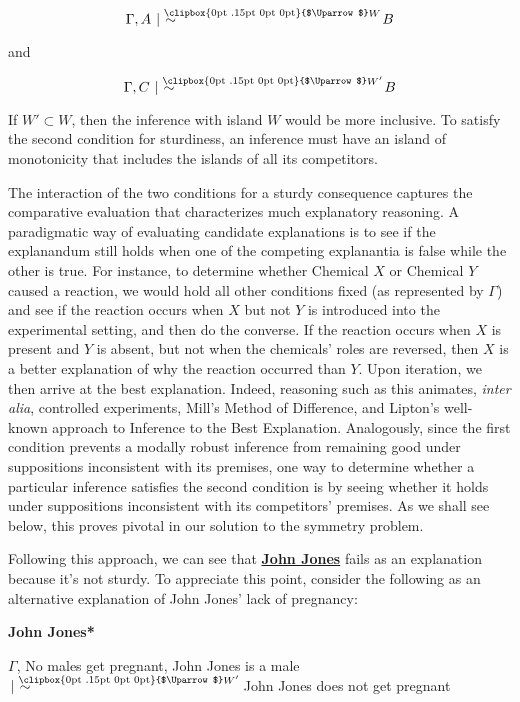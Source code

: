\documentclass[natbib]{svjour3}                     %
\makeatletter
\newcommand{\Uuparrow}{%
	\raisebox{.2ex}{\clipbox{0pt .15pt 0pt 0pt}{$\Uparrow$}}
}
\newcommand{\nms}{%
	\mathbin{\mathpalette\@nms\expandafter}
}
\newcommand{\@nms}{\mid\joinrel\mkern-.5mu\sim}
\newcommand{\mrc}[1]{\mathbin{
		\mathchoice
		{\normalsize\hspace{.5mm}\nms^{\mkern-19mu\scriptsize\Uuparrow#1}\hspace{-.5mm}}
		{\normalsize\hspace{.5mm}\nms^{\mkern-19mu\scriptsize\Uuparrow#1}\hspace{-.5mm}}
		{\footnotesize\hspace{.5mm}\nms^{\mkern-13.5mu\fontsize{5.5}{0}\Uuparrow#1}}
		{\scriptsize\nms^{\mkern-10mu\tiny\Uuparrow#1}}
	}
}
\makeatother
\begin{document}
\begin{equation*}
\Gamma, A \mrc{W} B
\end{equation*}

\noindent and

\begin{equation*}
\Gamma, C \mrc{W'} B
\end{equation*}

\noindent If $W' \subset W$, then the inference with island $W$ would be more inclusive.  To satisfy the second condition for sturdiness, an inference must have an island of monotonicity that includes the islands of all its competitors.

The interaction of the two conditions for a sturdy consequence captures the comparative evaluation that characterizes much explanatory reasoning. A paradigmatic way of evaluating candidate explanations is to see if the explanandum still holds when one of the competing explanantia is false while the other is true. For instance, to determine whether Chemical $X$ or Chemical $Y$ caused a reaction, we would hold all other conditions fixed (as represented by $\Gamma$) and see if the reaction occurs when $X$ but not $Y$ is introduced into the experimental setting, and then do the converse. If the reaction occurs when $X$ is present and $Y$ is absent, but not when the chemicals' roles are reversed, then $X$ is a better explanation of why the reaction occurred than $Y$. Upon iteration, we then arrive at the best explanation. Indeed, reasoning such as this animates, \textit{inter alia}, controlled experiments, Mill's Method of Difference, and Lipton's \citeyearpar{Lipton2004} well-known approach to Inference to the Best Explanation. Analogously, since the first condition prevents a modally robust inference from remaining good under suppositions inconsistent with its premises, one way to determine whether a particular inference satisfies the second condition is by seeing whether it holds under suppositions inconsistent with its competitors' premises. As we shall see below, this proves pivotal in our solution to the symmetry problem.

Following this approach, we can see that \hyperref[JohnJones]{\textbf{John Jones}} fails as an explanation because it's not sturdy. To appreciate this point, consider the following as an alternative explanation of John Jones' lack of pregnancy:\newline

\noindent \label{JohnJones*}\textbf{John Jones*}\hspace{8mm}\begin{minipage}[t]{.8\textwidth}
$\Gamma$, No males get pregnant, John Jones is a male\\
$ \mrc{W'} $  John Jones does not get pregnant\\
\end{minipage}
\end{document}
